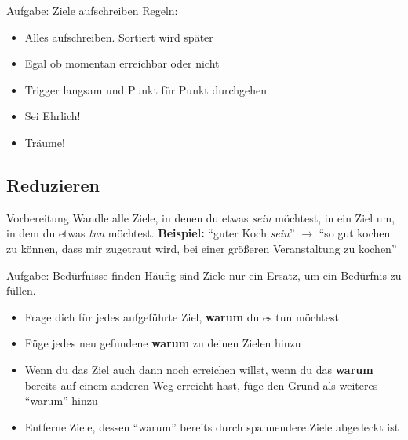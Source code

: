 \begin{frame}[c]
    \begin{block}{Aufgabe: Ziele aufschreiben}
    Regeln:
    \begin{itemize}
        \item Alles aufschreiben. Sortiert wird später
        \item Egal ob momentan erreichbar oder nicht
        \item Trigger langsam und Punkt für Punkt durchgehen
        \item Sei Ehrlich!
        \item Träume!
    \end{itemize}
    \end{block}
\end{frame}



\subsection{Reduzieren}

\begin{frame}[c]{Vorbereitung}
    \large
    Wandle alle Ziele, in denen du etwas {\em sein} möchtest, in ein Ziel um,
    in dem du etwas {\em tun} möchtest. \newline \newline \pause
    \textbf{Beispiel:} \enquote{guter Koch {\em sein}} $\rightarrow$
    \enquote{so gut kochen zu können, dass mir zugetraut wird, bei einer
    größeren Veranstaltung zu kochen}
\end{frame}

\begin{frame}[c]
    \normalsize
    \begin{block}{Aufgabe: Bedürfnisse finden}
    Häufig sind Ziele nur ein Ersatz, um ein Bedürfnis zu füllen.
    \begin{itemize}
        \item Frage dich für jedes aufgeführte Ziel, \textbf{warum} du es tun möchtest
        \item Füge jedes neu gefundene \textbf{warum} zu deinen Zielen hinzu
        \item Wenn du das Ziel auch dann noch erreichen willst, wenn du das
            \textbf{warum} bereits auf einem anderen Weg erreicht hast, füge
            den Grund als weiteres \enquote{warum} hinzu
        \item Entferne Ziele, dessen \enquote{warum} bereits durch spannendere Ziele abgedeckt ist
    \end{itemize}
    \end{block}
\end{frame}


